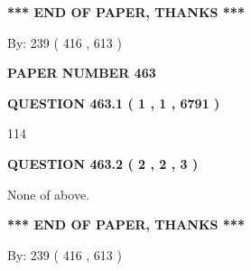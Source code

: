 \documentclass[12pt]{article}
\begin{document}
   
   
\vspace{1.0in} 
{\textbf{\large{ *** END OF PAPER, THANKS *** }}} 
   
   
\hspace{1.0in} By: 
 239 ( 416 ,  613 )
   
   
   
   
\newpage 
\setcounter{page}{ 
   463001 } 
   
   
   
   
 {\textbf{ \Large{ PAPER NUMBER  463  }}}
   
   
\vspace{0.2in}
   
   
   
   
   
   
 \vspace{0.2in}
 
 
 
 
   
   
  
\vspace{0.2in}
  
{\textbf{\Large{QUESTION
463.1 
 ( 1 , 1 , 6791 )
}}}
  
  
 
 
\noindent{}

114
 
 
  
\vspace{0.2in}
  
{\textbf{\Large{QUESTION
463.2 
 ( 2 , 2 , 3 )
}}}
  
  
 
 
\noindent{}
 
 
 None of above.
 
 
 
 
   
   
 \vspace{0.2in}
 
   
   
   
   
\vspace{1.0in} 
{\textbf{\large{ *** END OF PAPER, THANKS *** }}} 
   
   
\hspace{1.0in} By: 
 239 ( 416 ,  613 )
   
\end{document}

